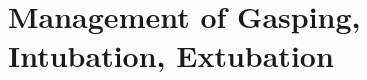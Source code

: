 \documentclass[11pt,a4paper]{report}
\begin{document}
%
%


\chapter{Management of Gasping, Intubation, Extubation}
\end{document}
